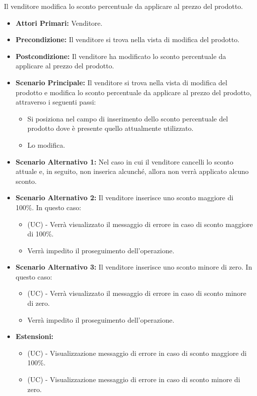 Il venditore modifica lo sconto percentuale da applicare al prezzo del prodotto.
\begin{itemize}
    \item \textbf{Attori Primari:} Venditore.
    \item \textbf{Precondizione:} Il venditore si trova nella vista di modifica del prodotto.
    \item \textbf{Postcondizione:} Il venditore ha modificato lo sconto percentuale da applicare al prezzo del prodotto.
    \item \textbf{Scenario Principale:} Il venditore si trova nella vista di modifica del prodotto e modifica lo sconto percentuale da applicare al prezzo del prodotto, attraverso i seguenti passi:
    \begin{itemize}
        \item Si posiziona nel campo di inserimento dello sconto percentuale del prodotto dove è presente quello attualmente utilizzato.
        \item Lo modifica.
    \end{itemize}
    \item \textbf{Scenario Alternativo 1:} Nel caso in cui il venditore cancelli lo sconto attuale e, in seguito, non inserica alcunché, allora non verrà applicato alcuno sconto.
    \item \textbf{Scenario Alternativo 2:} Il venditore inserisce uno sconto maggiore di 100\%. In questo caso:
    \begin{itemize}
        \item (UC) - Verrà visualizzato il messaggio di errore in caso di sconto maggiore di 100\%.
        \item Verrà impedito il proseguimento dell'operazione.
    \end{itemize}
    \item \textbf{Scenario Alternativo 3:} Il venditore inserisce uno sconto minore di zero. In questo caso:
    \begin{itemize}
        \item (UC) - Verrà visualizzato il messaggio di errore in caso di sconto minore di zero.
        \item Verrà impedito il proseguimento dell'operazione.
    \end{itemize}
    \item \textbf{Estensioni:}
        \begin{itemize}
            \item (UC) - Visualizzazione messaggio di errore in caso di sconto maggiore di 100\%.
            \item (UC) - Visualizzazione messaggio di errore in caso di sconto minore di zero.
        \end{itemize}
\end{itemize}

